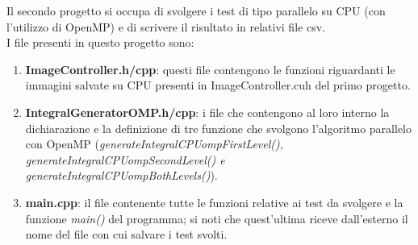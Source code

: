\documentclass[10pt,twocolumn,letterpaper]{article}
\begin{document}
Il secondo progetto si occupa di svolgere i test di tipo parallelo su CPU (con l’utilizzo di OpenMP) e di scrivere il risultato in relativi file csv.\\
I file presenti in questo progetto sono:
\begin{enumerate}
\item{\textbf{ImageController.h/cpp}: questi file contengono le funzioni riguardanti le immagini salvate su CPU presenti in ImageController.cuh del primo progetto.}
\item{\textbf{IntegralGeneratorOMP.h/cpp}: i file che contengono al loro interno la dichiarazione e la definizione di tre funzione che svolgono l’algoritmo parallelo con OpenMP (\textit{generateIntegralCPUompFirstLevel(), generateIntegralCPUompSecondLevel() e generateIntegralCPUompBothLevels()}).}
\item{\textbf{main.cpp}: il file contenente tutte le funzioni relative ai test da svolgere e la funzione \textit{main()} del programma; si noti che quest'ultima riceve dall'esterno il nome del file con cui salvare i test svolti.}

\end{enumerate}
\end{document}
